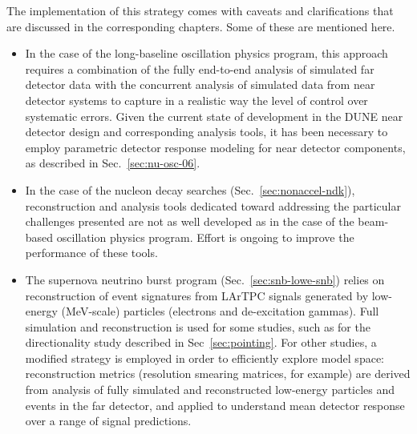 The implementation of this strategy comes with caveats
and clarifications that are discussed in the corresponding
chapters.  Some of these are mentioned here.
\begin{itemize}
\item In the case of the long-baseline oscillation physics
      program, this approach requires a combination of the 
      fully end-to-end analysis of simulated far detector data
      with the concurrent analysis of simulated data from
      near detector systems to capture in a realistic way 
      the level of 
      control over systematic errors.  Given the 
      current state of development in the DUNE near detector design and 
      corresponding analysis tools,  it has been necessary to 
      employ parametric detector response modeling for near 
      detector components, as described in
      Sec.~\ref{sec:nu-osc-06}.

\item In the case of the nucleon decay searches
      (Sec.~\ref{sec:nonaccel-ndk}),
      reconstruction and analysis tools dedicated toward
      addressing the particular challenges presented are 
      not as well developed as in the case of the 
      beam-based oscillation physics program. Effort is 
      ongoing to improve the performance of these tools. 

\item The supernova neutrino burst program (Sec.~\ref{sec:snb-lowe-snb}) relies on reconstruction of event signatures from LArTPC signals generated by low-energy (MeV-scale) particles (electrons and de-excitation gammas).  Full simulation and reconstruction is used for some studies, such as for the directionality study described in Sec~\ref{sec:pointing}.
For other studies, a modified strategy is employed in order to efficiently explore model space:  reconstruction metrics (resolution smearing matrices, for example) are derived from analysis of fully simulated and reconstructed low-energy particles and events in the far detector, and applied to understand mean detector response over a range of signal predictions.


\end{itemize}
